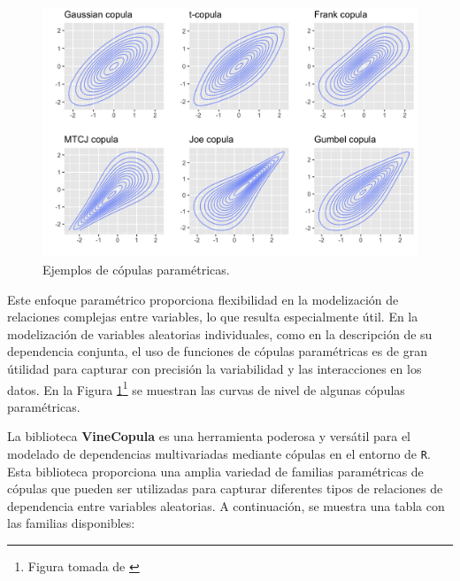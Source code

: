\begin{figure}[H]
    \centering
    \includegraphics[width = 0.65 \textwidth]{Imagenes/parametricCopulas.png}
    \caption{Ejemplos de cópulas paramétricas.}
    \label{fig:Parametric}
\end{figure}


Este enfoque paramétrico proporciona flexibilidad en la modelización de relaciones complejas entre variables, lo que resulta especialmente útil. En la modelización de variables aleatorias individuales, como en la descripción de su dependencia conjunta, el uso de funciones de cópulas paramétricas es de gran útilidad para capturar con precisión la variabilidad y las interacciones en los datos. En la Figura \ref{fig:Parametric}\footnote{Figura tomada de \cite{ImgCopulas}} se muestran las curvas de nivel de algunas cópulas paramétricas.



La biblioteca \textbf{VineCopula} es una herramienta poderosa y versátil para el modelado de dependencias multivariadas mediante cópulas en el entorno de \texttt{R}. Esta biblioteca proporciona una amplia variedad de familias paramétricas de cópulas que pueden ser utilizadas para capturar diferentes tipos de relaciones de dependencia entre variables aleatorias. A continuación, se muestra una tabla con las familias disponibles:

